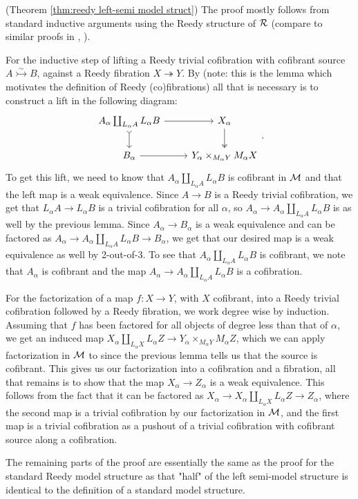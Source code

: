 \documentclass{amsart}
\begin{document}
\begin{sketch}
    (Theorem \ref{thm:reedy left-semi model struct}) The proof mostly follows from standard inductive arguments using the Reedy structure of $\mathcal{R}$ (compare to similar proofs in \cite[Ch. 15]{Hirshhorn}, \cite[Ch. 9]{RadulescuBanu}).

    For the inductive step of lifting a Reedy trivial cofibration with cofibrant source $A\overset{\sim}{\rightarrowtail}B$, against a Reedy fibration $X\twoheadrightarrow Y$. By \cite[15.2.11]{Hirshhorn} (note: this is the lemma which motivates the definition of Reedy (co)fibrations) all that is necessary is to construct a lift in the following diagram:
    \[\begin{tikzcd}
        A_\alpha\coprod_{L_\alpha A}L_\alpha B \arrow[r] \arrow[d, tail] & X_\alpha \arrow[d, two heads]\\
        B_\alpha \arrow[r] & Y_\alpha\times_{M_\alpha Y}M_\alpha X
    \end{tikzcd}.\]
    To get this lift, we need to know that $A_\alpha\coprod_{L_\alpha A}L_\alpha B$ is cofibrant in $\mathcal{M}$ and that the left map is a weak equivalence. Since $A\to B$ is a Reedy trivial cofibration, we get that $L_\alpha A\to L_\alpha B$ is a trivial cofibration for all $\alpha$, so $A_\alpha\to A_\alpha\coprod_{L_\alpha A}L_\alpha B$ is as well by the previous lemma. Since $A_\alpha\to B_\alpha$ is a weak equivalence and can be factored as $A_\alpha\to A_\alpha\coprod_{L_\alpha A}L_\alpha B\to B_\alpha$, we get that our desired map is a weak equivalence as well by 2-out-of-3. To see that $A_\alpha\coprod_{L_\alpha A}L_\alpha B$ is cofibrant, we note that $A_\alpha$ is cofibrant and the map $A_\alpha\to A_\alpha\coprod_{L_\alpha A}L_\alpha B$ is a cofibration.

    For the factorization of a map $f\colon X\to Y$, with $X$ cofibrant, into a Reedy trivial cofibration followed by a Reedy fibration, we work degree wise by induction. Assuming that $f$ has been factored for all objects of degree less than that of $\alpha$, we get an induced map $X_\alpha\coprod_{L_\alpha X}L_\alpha Z\to Y_\alpha\times_{M_\alpha Y}M_\alpha Z$, which we can apply factorization in $\mathcal{M}$ to since the previous lemma tells us that the source is cofibrant. This gives us our factorization into a cofibration and a fibration, all that remains is to show that the map $X_\alpha\to Z_\alpha$ is a weak equivalence. This follows from the fact that it can be factored as $X_\alpha\to X_\alpha\coprod_{L_\alpha X}L_\alpha Z\to Z_\alpha$, where the second map is a trivial cofibration by our factorization in $\mathcal{M}$, and the first map is a trivial cofibration as a pushout of a trivial cofibration with cofibrant source along a cofibration.

    The remaining parts of the proof are essentially the same as the proof for the standard Reedy model structure as that "half" of the left semi-model structure is identical to the definition of a standard model structure.
\end{sketch}
\end{document}
